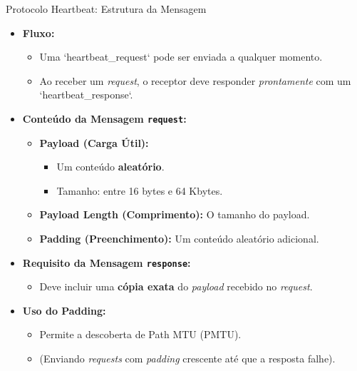 \begin{frame}{Protocolo Heartbeat: Estrutura da Mensagem}
    \begin{itemize}
        \item \textbf{Fluxo:}
              \begin{itemize}
                  \item Uma `heartbeat\_request` pode ser enviada a qualquer momento.
                  \item Ao receber um \textit{request}, o receptor deve responder \textit{prontamente} com um `heartbeat\_response`.
              \end{itemize}

        \item \textbf{Conteúdo da Mensagem \texttt{request}:}
              \begin{itemize}
                  \item \textbf{Payload (Carga Útil):}
                        \begin{itemize}
                            \item Um conteúdo \textbf{aleatório}.
                            \item Tamanho: entre 16 bytes e 64 Kbytes.
                        \end{itemize}
                  \item \textbf{Payload Length (Comprimento):} O tamanho do payload.
                  \item \textbf{Padding (Preenchimento):} Um conteúdo aleatório adicional.
              \end{itemize}

        \item \textbf{Requisito da Mensagem \texttt{response}:}
              \begin{itemize}
                  \item Deve incluir uma \textbf{cópia exata} do \textit{payload} recebido no \textit{request}.
              \end{itemize}

        \item \textbf{Uso do Padding:}
              \begin{itemize}
                  \item Permite a descoberta de Path MTU (PMTU).
                  \item (Enviando \textit{requests} com \textit{padding} crescente até que a resposta falhe).
              \end{itemize}
    \end{itemize}
\end{frame}

